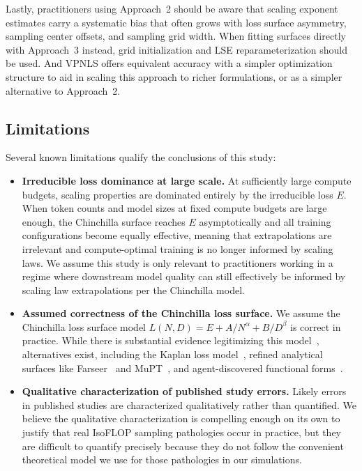 \documentclass[11pt]{article}
\begin{document}
Lastly, practitioners using Approach~2 should be aware that scaling exponent
estimates carry a systematic bias that often grows with loss surface asymmetry,
sampling center offsets, and sampling grid width. When fitting surfaces
directly with Approach~3 instead, grid initialization and LSE
reparameterization should be used. And VPNLS offers equivalent accuracy with a
simpler optimization structure to aid in scaling this approach to richer
formulations, or as a simpler alternative to Approach~2.

\subsection{Limitations}
\label{sec:limitations}

Several known limitations qualify the conclusions of this study:

\begin{itemize}
    \item \textbf{Irreducible loss dominance at large scale.} At sufficiently
        large compute budgets, scaling properties are dominated entirely by the
        irreducible loss $E$. When token counts and model sizes at fixed compute
        budgets are large enough, the Chinchilla surface reaches $E$
        asymptotically and all training configurations become equally effective,
        meaning that extrapolations are irrelevant and compute-optimal training
        is no longer informed by scaling laws. We assume this study is only
        relevant to practitioners working in a regime where downstream model
        quality can still effectively be informed by scaling law extrapolations
        per the Chinchilla model.

    \item \textbf{Assumed correctness of the Chinchilla loss surface.} We
        assume the Chinchilla loss surface model
        $L(N, D) = E + A/N^\alpha + B/D^\beta$ is correct in practice. While
        there is substantial evidence legitimizing this
        model~\citep{chinchilla_robustness}, alternatives exist, including the
        Kaplan loss model~\citep{kaplan_scaling}, refined analytical surfaces
        like Farseer~\citep{farseer} and MuPT~\citep{mupt}, and
        agent-discovered functional forms~\citep{sld_agent}.

    \item \textbf{Qualitative characterization of published study errors.}
        Likely errors in published studies are characterized qualitatively
        rather than quantified. We believe the qualitative characterization is
        compelling enough on its own to justify that real IsoFLOP sampling
        pathologies occur in practice, but they are difficult to quantify
        precisely because they do not follow the convenient theoretical model we
        use for those pathologies in our simulations.
\end{itemize}
\end{document}
